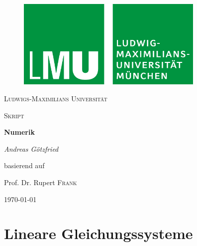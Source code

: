 \documentclass{article}
\begin{document}
\begin{titlepage}
\centering
    \begin{figure}
    \centering
	    \includegraphics[width=90mm]{logo_lmu.jpg}
    \end{figure}
	{\scshape\LARGE Ludwigs-Maximilians Universität \par}
	\vspace{1cm}
	{\scshape\Large Skript \par}
	\vspace{1.5cm}
	{\huge\bfseries Numerik\par}
	\vspace{2cm}
	{\Large\itshape Andreas Götzfried\par}
    \vfill
	    basierend auf\par
	    Prof. Dr. Rupert \textsc{Frank}
    \vfill
	{\large \today\par}
\end{titlepage}
\tableofcontents{}

\newpage
\section{Lineare Gleichungssysteme}
\end{document}
